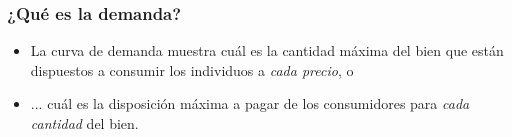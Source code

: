 \documentclass{beamer}
\begin{document}
\begin{frame}
\frametitle{¿Qué es la demanda?}
    \begin{itemize}
        \item La curva de demanda muestra cuál es la cantidad máxima del bien que están dispuestos a consumir los individuos a \textit{cada precio}, o \vspace{2mm}
        \item ...  cuál es la disposición máxima a pagar de los consumidores para \textit{cada cantidad} del bien.
    \end{itemize}
    \begin{center}
    \begin{figure}[H]
    \renewcommand{\figurename}{Figure}
    \begin{center}
    \end{center}
    \end{figure}
    \end{center}
\end{frame}
\end{document}
